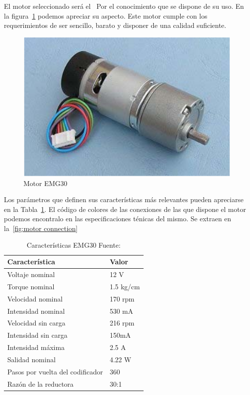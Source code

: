 
El motor seleccionado será el~\cite{EMG30datasheet} Por el conocimiento que se dispone de su uso.
En la figura~\cref{fig:EMG Motor} podemos apreciar su aspecto.
Este motor cumple con los requerimientos de ser sencillo, barato y disponer de una calidad suficiente.

\begin{figure}[H]
    \centering
    \includegraphics[scale = 0.4]{part/Proyecto_ejecutivo/memoria_constructiva/motor/img/MotorEMG30}
    \caption{Motor EMG30\cite{EMG30datasheet}}\label{fig:EMG Motor}
\end{figure}

Los parámetros que definen sus características más relevantes pueden apreciarse en la Tabla~\ref{tab:EMG30specifications}.
El código de colores de las conexiones de las que dispone el motor podemos encontralo en las especificaciones ténicas del mismo.
Se extraen en la~\cref{fig:motor connection}


\begin{table}[H]
    \centering
    \begin{tabular}{|l|l|}
        \hline
        Característica & Valor\\
        \hline
        Voltaje nominal & 12 V\\
        \hline
        Torque nominal & 1.5 kg/cm\\
        \hline
        Velocidad nominal & 170 rpm\\
        \hline
        Intensidad nominal & 530 mA\\
        \hline
        Velocidad sin carga& 216 rpm\\
        \hline
        Intensidad sin carga& 150mA\\
        \hline
        Intensidad máxima& 2.5 A\\
        \hline
        Salidad nominal & 4.22 W\\
        \hline
        Pasos por vuelta del codificador& 360 \\
        \hline
        Razón de la reductora & 30:1\\
        \hline
    \end{tabular}
    \caption{Características EMG30 Fuente:\cite{EMG30datasheet}}\label{tab:EMG30specifications}
\end{table}


